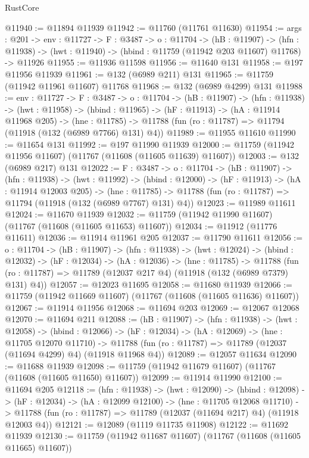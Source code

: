 \begin{lexlean}{RustCore}
\begin{coremodule}
@11940 := @11894 @11939
@11942 := @11760 (@11761 @11630)
@11954 := {args : @201} ->
  {env : @11727} ->
  {F : @3487} ->
  {o : @11704} ->
  (hB : @11907) ->
  (hfn : @11938) -> (hwt : @11940) -> (hbind : @11759 (@11942 @203 @11607) @11768) -> @11926
@11955 := @11936 @11598
@11956 := @11640 @131
@11958 := @197 @11956 @11939
@11961 := @132 (@6989 @211) @131
@11965 := @11759 (@11942 @11961 @11607) @11768
@11968 := @132 (@6989 @4299) @131
@11988 := {env : @11727} ->
  {F : @3487} ->
  {o : @11704} ->
  (hB : @11907) ->
  (hfn : @11938) ->
  (hwt : @11958) ->
  (hbind : @11965) ->
  (hF : @11913) ->
  (hA : @11914 @11968 @205) ->
  (hne : @11785) -> @11788 (fun (ro : @11787) => @11794 (@11918 (@132 (@6989 @7766) @131) @4))
@11989 := @11955 @11610
@11990 := @11654 @131
@11992 := @197 @11990 @11939
@12000 := @11759 (@11942 @11956 @11607) (@11767 (@11608 (@11605 @11639) @11607))
@12003 := @132 (@6989 @217) @131
@12022 := {F : @3487} ->
  {o : @11704} ->
  (hB : @11907) ->
  (hfn : @11938) ->
  (hwt : @11992) ->
  (hbind : @12000) ->
  (hF : @11913) ->
  (hA : @11914 @12003 @205) ->
  (hne : @11785) -> @11788 (fun (ro : @11787) => @11794 (@11918 (@132 (@6989 @7767) @131) @4))
@12023 := @11989 @11611
@12024 := @11670 @11939
@12032 := @11759 (@11942 @11990 @11607) (@11767 (@11608 (@11605 @11653) @11607))
@12034 := @11912 (@11776 @11611)
@12036 := @11914 @11961 @205
@12037 := @11790 @11611
@12056 := {o : @11704} ->
  (hB : @11907) ->
  (hfn : @11938) ->
  (hwt : @12024) ->
  (hbind : @12032) ->
  (hF : @12034) ->
  (hA : @12036) ->
  (hne : @11785) ->
  @11788 (fun (ro : @11787) => @11789 (@12037 @217 @4) (@11918 (@132 (@6989 @7379) @131) @4))
@12057 := @12023 @11695
@12058 := @11680 @11939
@12066 := @11759 (@11942 @11669 @11607) (@11767 (@11608 (@11605 @11636) @11607))
@12067 := @11914 @11956
@12068 := @11694 @203
@12069 := @12067 @12068
@12070 := @11694 @211
@12088 := (hB : @11907) ->
  (hfn : @11938) ->
  (hwt : @12058) ->
  (hbind : @12066) ->
  (hF : @12034) ->
  (hA : @12069) ->
  (hne : @11705 @12070 @11710) ->
  @11788 (fun (ro : @11787) => @11789 (@12037 (@11694 @4299) @4) (@11918 @11968 @4))
@12089 := @12057 @11634
@12090 := @11688 @11939
@12098 := @11759 (@11942 @11679 @11607) (@11767 (@11608 (@11605 @11650) @11607))
@12099 := @11914 @11990
@12100 := @11694 @205
@12118 := (hfn : @11938) ->
  (hwt : @12090) ->
  (hbind : @12098) ->
  (hF : @12034) ->
  (hA : @12099 @12100) ->
  (hne : @11705 @12068 @11710) ->
  @11788 (fun (ro : @11787) => @11789 (@12037 (@11694 @217) @4) (@11918 @12003 @4))
@12121 := @12089 (@1119 @11735 @11908)
@12122 := @11692 @11939
@12130 := @11759 (@11942 @11687 @11607) (@11767 (@11608 (@11605 @11665) @11607))

\end{coremodule}
\end{lexlean}
